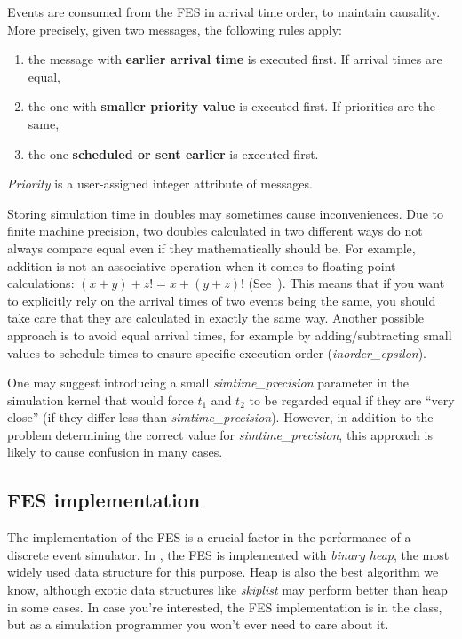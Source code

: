 Events are consumed from the FES in arrival time order, to
maintain causality. More precisely, given two messages, the following
rules apply:
\begin{enumerate}
\item{the message with \textbf{earlier arrival time} is executed
    first.  If arrival times are equal,}
\item{the one with \textbf{smaller priority value} is executed first.
    If priorities are the same,}
\item{the one \textbf{scheduled or sent earlier} is executed first.}
\end{enumerate}

\textit{Priority} is a user-assigned integer
attribute of messages.

Storing simulation time in doubles may sometimes cause inconveniences.
Due to finite machine precision, two doubles calculated in two
different ways do not always compare equal even if they mathematically
should be. For example, addition is not an associative operation
when it comes to floating point calculations: $(x+y)+z != x+(y+z)$!
(See~\cite{Goldberg91what}).
This means that if you want to explicitly rely on the
arrival times of two events being the same, you should take care that
they are calculated in exactly the same way.
Another possible approach is to avoid equal arrival times,
for example by adding/subtracting small values to schedule times to
ensure specific execution order
(\textit{inorder\_epsilon}).

One may suggest introducing a small \textit{simtime\_precision} parameter in
the simulation kernel that would force $t_{1}$ and $t_{2}$ to be regarded
equal if they are ``very close'' (if they differ
less than \textit{simtime\_precision}). However, in addition to the problem
determining the correct value for \textit{simtime\_precision},
this approach is likely to cause confusion in many cases.



\subsection{FES implementation}

The implementation of the FES is a crucial factor in the
performance of a discrete event simulator. In {\opp}, the FES is
implemented with \textit{binary heap}, the most
widely used data structure for this purpose. Heap is also the best
algorithm we know, although exotic data structures like
\textit{skiplist} may perform better than heap in some
cases. In case you're interested, the FES implementation is in the
 class, but as a simulation programmer you won't
ever need to care about it.





